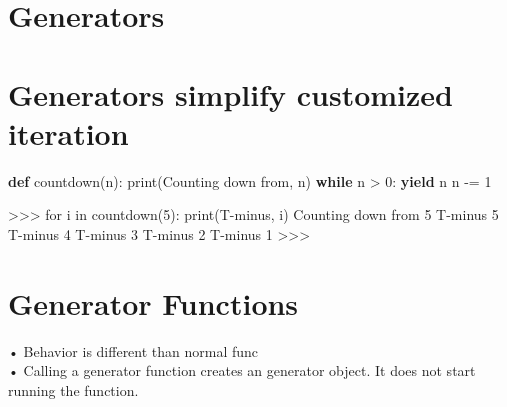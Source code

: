 \documentclass[
  letterpaper,
  DIV=11,
  numbers=noendperiod]{scrreprt}
\newenvironment{Shaded}{\begin{snugshade}}{\end{snugshade}}
\newcommand{\BuiltInTok}[1]{\textcolor[rgb]{0.00,0.23,0.31}{#1}}
\newcommand{\ControlFlowTok}[1]{\textcolor[rgb]{0.00,0.23,0.31}{\textbf{#1}}}
\newcommand{\DecValTok}[1]{\textcolor[rgb]{0.68,0.00,0.00}{#1}}
\newcommand{\KeywordTok}[1]{\textcolor[rgb]{0.00,0.23,0.31}{\textbf{#1}}}
\newcommand{\NormalTok}[1]{\textcolor[rgb]{0.00,0.23,0.31}{#1}}
\newcommand{\OperatorTok}[1]{\textcolor[rgb]{0.37,0.37,0.37}{#1}}
\newcommand{\StringTok}[1]{\textcolor[rgb]{0.13,0.47,0.30}{#1}}
\begin{document}

\chapter{Generators}\label{generators-1}


\chapter{Generators simplify customized
iteration}\label{generators-simplify-customized-iteration}

\begin{Shaded}
\begin{Highlighting}[]
\KeywordTok{def}\NormalTok{ countdown(n):}
    \BuiltInTok{print}\NormalTok{(}\StringTok{\textquotesingle{}Counting down from\textquotesingle{}}\NormalTok{, n)}
    \ControlFlowTok{while}\NormalTok{ n }\OperatorTok{\textgreater{}} \DecValTok{0}\NormalTok{:}
        \ControlFlowTok{yield}\NormalTok{ n}
\NormalTok{        n }\OperatorTok{{-}=} \DecValTok{1} 
\end{Highlighting}
\end{Shaded}

\begin{Shaded}
\begin{Highlighting}[]
\NormalTok{\textgreater{}\textgreater{}\textgreater{} for i in countdown(5): print(\textquotesingle{}T{-}minus\textquotesingle{}, i)   }
\NormalTok{Counting down from 5   }
\NormalTok{T{-}minus 5   }
\NormalTok{T{-}minus 4   }
\NormalTok{T{-}minus 3   }
\NormalTok{T{-}minus 2   }
\NormalTok{T{-}minus 1   }
\NormalTok{\textgreater{}\textgreater{}\textgreater{} }
\end{Highlighting}
\end{Shaded}


\chapter{Generator Functions}\label{generator-functions-1}

• Behavior is different than normal func\\
• Calling a generator function creates an generator object. It does not
start running the function.
\end{document}
